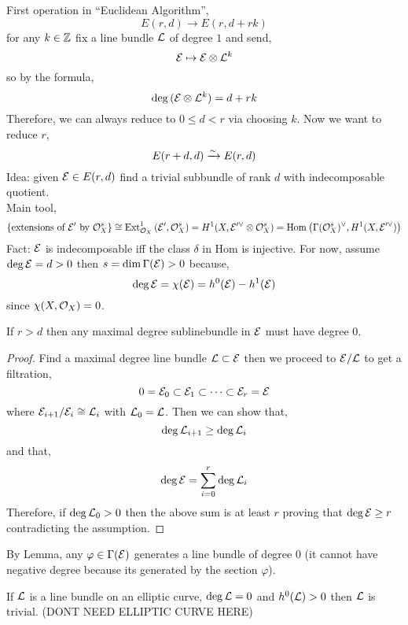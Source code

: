 \documentclass[12pt]{article}
\begin{document}
First operation in ``Euclidean Algorithm'',
\[ E(r,d) \to E(r, d + rk) \]
for any $k \in \mathbb{Z}$ fix a line bundle $\mathcal{L}$ of degree $1$ and send,
\[ \mathcal{E} \mapsto \mathcal{E} \otimes \mathcal{L}^k \]
so by the formula,
\[ \deg{(\mathcal{E}\otimes\mathcal{L}^k)} = d + r k \]
Therefore, we can always reduce to $0 \le d < r$ via choosing $k$. Now we want to reduce $r$,
\[ E(r+d,d) \xrightarrow{\sim} E(r,d) \]
Idea: given $\mathcal{E} \in E(r, d)$ find a trivial subbundle of rank $d$ with indecomposable quotient. 
\bigskip\\
Main tool,
\[ \{ \text{extensions of } \mathcal{E}' \text{ by } \mathcal{O}_{X}^s \} \cong \mathrm{Ext}^{1}_{\mathcal{O}_{X}} \left( \mathcal{E}', \mathcal{O}_{X}^s \right) = H^1(X, \mathcal{E}'^\vee \otimes \mathcal{O}_{X}^s) = \mathrm{Hom}_{} \left( \Gamma(\mathcal{O}_{X}^s)^\vee, H^1(X, \mathcal{E}'^\vee) \right) \]
Fact: $\mathcal{E}$ is indecomposable iff the class $\delta$ in Hom is injective. For now, assume $\deg{\mathcal{E}} = d > 0$ then $s = \dim{\Gamma(\mathcal{E})} > 0$ because,
\[ \deg{\mathcal{E}} = \chi(\mathcal{E}) = h^0(\mathcal{E}) - h^1(\mathcal{E}) \]
since $\chi(X, \mathcal{O}_{X}) = 0$. 

\begin{lemma}
If $r > d$ then any maximal degree sublinebundle in $\mathcal{E}$ must have degree $0$. 
\end{lemma}

\begin{proof}
Find a maximal degree line bundle $\mathcal{L} \subset \mathcal{E}$ then we proceed to $\mathcal{E} / \mathcal{L}$ to get a filtration,
\[ 0 = \mathcal{E}_0 \subset \mathcal{E}_1 \subset \cdots \subset \mathcal{E}_r = \mathcal{E} \]
where $\mathcal{E}_{i+1}/\mathcal{E}_i \cong \mathcal{L}_i$ with $\mathcal{L}_0 = \mathcal{L}$. Then we can show that,
\[ \deg{\mathcal{L}_{i+1}} \ge \deg{\mathcal{L}_i} \]
and that,
\[ \deg{\mathcal{E}} = \sum_{i = 0}^r \deg{\mathcal{L}_i} \]
Therefore, if $\deg{\mathcal{L}_0} > 0$ then the above sum is at least $r$ proving that $\deg{\mathcal{E}} \ge r$ contradicting the assumption.
\end{proof}

By Lemma, any $\varphi \in \Gamma(\mathcal{E})$ generates a line bundle of degree $0$ (it cannot have negative degree because its generated by the section $\varphi$).

\begin{example}
If $\mathcal{L}$ is a line bundle on an elliptic curve, $\deg{\mathcal{L}} = 0$ and $h^0(\mathcal{L}) > 0$ then $\mathcal{L}$ is trivial. (DONT NEED ELLIPTIC CURVE HERE)
\end{example}
\end{document}
